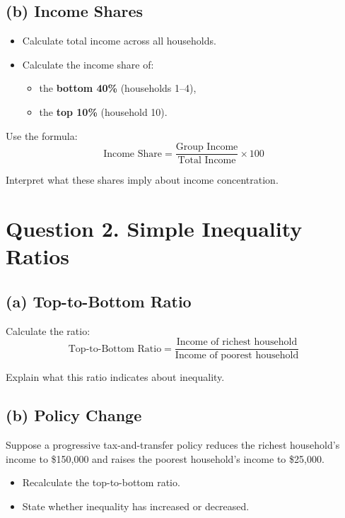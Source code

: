 \documentclass[11pt]{article}
\begin{document}
\subsection*{(b) Income Shares}

\begin{itemize}
\item Calculate total income across all households.
\item Calculate the income share of:
\begin{itemize}
\item the \textbf{bottom 40\%} (households 1--4),
\item the \textbf{top 10\%} (household 10).
\end{itemize}
\end{itemize}

Use the formula:
\[
\text{Income Share} = \frac{\text{Group Income}}{\text{Total Income}} \times 100
\]

Interpret what these shares imply about income concentration.

\section*{Question 2. Simple Inequality Ratios}

\subsection*{(a) Top-to-Bottom Ratio}

Calculate the ratio:
\[
\text{Top-to-Bottom Ratio} = \frac{\text{Income of richest household}}{\text{Income of poorest household}}
\]

Explain what this ratio indicates about inequality.

\subsection*{(b) Policy Change}

Suppose a progressive tax-and-transfer policy reduces the richest household's income to \$150{,}000 and raises the poorest household's income to \$25{,}000.

\begin{itemize}
\item Recalculate the top-to-bottom ratio.
\item State whether inequality has increased or decreased.
\end{itemize}
\end{document}
